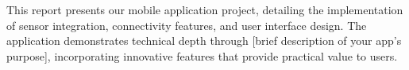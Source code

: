 This report presents our mobile application project, detailing the implementation of sensor integration, connectivity features, and user interface design. The application demonstrates technical depth through [brief description of your app's purpose], incorporating innovative features that provide practical value to users.
